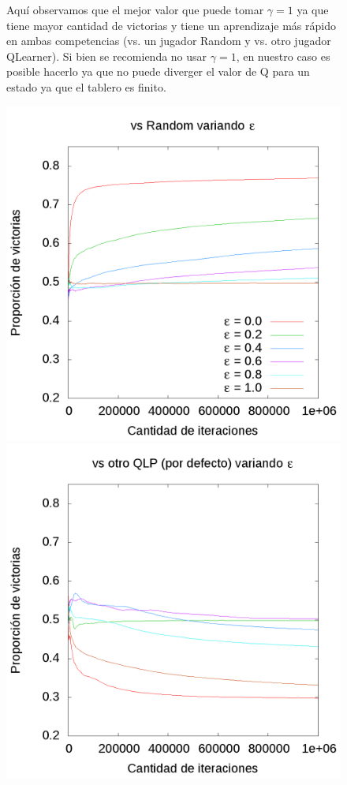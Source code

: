 \documentclass[10pt, a4paper]{article}
\begin{document}
\begin{figure}[H]
\begin{minipage}[c]{1\textwidth}
	\caption{Aquí observamos que el mejor valor que puede tomar $\gamma = 1$ ya que tiene mayor cantidad de victorias y tiene un aprendizaje más rápido en ambas competencias (vs. un jugador Random y vs. otro jugador QLearner). Si bien se recomienda no usar $\gamma = 1$, en nuestro caso es posible hacerlo ya que no puede diverger el valor de Q para un estado ya que el tablero es finito. }
  \end{minipage}
\end{figure}
\begin{figure}[H]
  \begin{minipage}[c]{1\textwidth}
	\includegraphics[scale=0.2]{EpsilonR.png}
	\includegraphics[scale=0.2]{EpsilonQ.png}

\end{minipage}
\end{figure}
\end{document}
